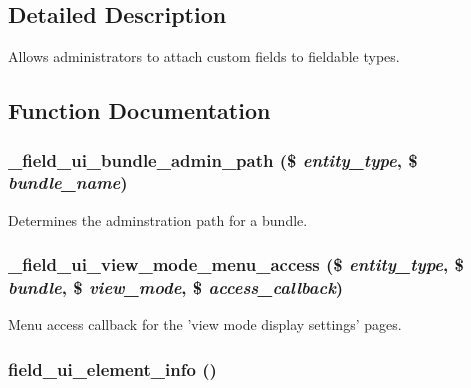 \subsection{Detailed Description}
Allows administrators to attach custom fields to fieldable types. 

\subsection{Function Documentation}
\hypertarget{field__ui_8module_a64548860d564d7e793789482379fa29f}{
\subsubsection[{\_\-field\_\-ui\_\-bundle\_\-admin\_\-path}]{\setlength{\rightskip}{0pt plus 5cm}\_\-field\_\-ui\_\-bundle\_\-admin\_\-path (\$ {\em entity\_\-type}, \/  \$ {\em bundle\_\-name})}}
\label{field__ui_8module_a64548860d564d7e793789482379fa29f}
Determines the adminstration path for a bundle. \hypertarget{field__ui_8module_a6b12ecad88197fdae1bcf83e3c0f9354}{
\subsubsection[{\_\-field\_\-ui\_\-view\_\-mode\_\-menu\_\-access}]{\setlength{\rightskip}{0pt plus 5cm}\_\-field\_\-ui\_\-view\_\-mode\_\-menu\_\-access (\$ {\em entity\_\-type}, \/  \$ {\em bundle}, \/  \$ {\em view\_\-mode}, \/  \$ {\em access\_\-callback})}}
\label{field__ui_8module_a6b12ecad88197fdae1bcf83e3c0f9354}
Menu access callback for the 'view mode display settings' pages. \hypertarget{field__ui_8module_ab692b5bd1afde931919087fa5b172da5}{
\subsubsection[{field\_\-ui\_\-element\_\-info}]{\setlength{\rightskip}{0pt plus 5cm}field\_\-ui\_\-element\_\-info ()}}
